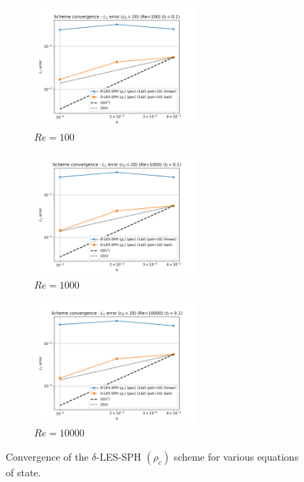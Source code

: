 \begin{figure}[H]
  \begin{subfigure}{7cm}
    \centering\includegraphics[width=6cm]{Code-Figures/deltales/eos/dt_pois_conv_c0_20_re_100.png}
    \caption{$Re = 100$}
  \end{subfigure}
  \begin{subfigure}{7cm}
    \centering\includegraphics[width=6cm]{Code-Figures/deltales/eos/dt_pois_conv_c0_20_re_1000.png}
    \caption{$Re = 1000$}
  \end{subfigure}
  \begin{subfigure}{7cm}
    \centering\includegraphics[width=6cm]{Code-Figures/deltales/eos/dt_pois_conv_c0_20_re_10000.png}
    \caption{$Re = 10000$}
  \end{subfigure}
  \caption{Convergence of the $\delta$-LES-SPH $(\rho_c)$ scheme for various equations of state.}
  \label{fig:deltales-eos}
\end{figure}

